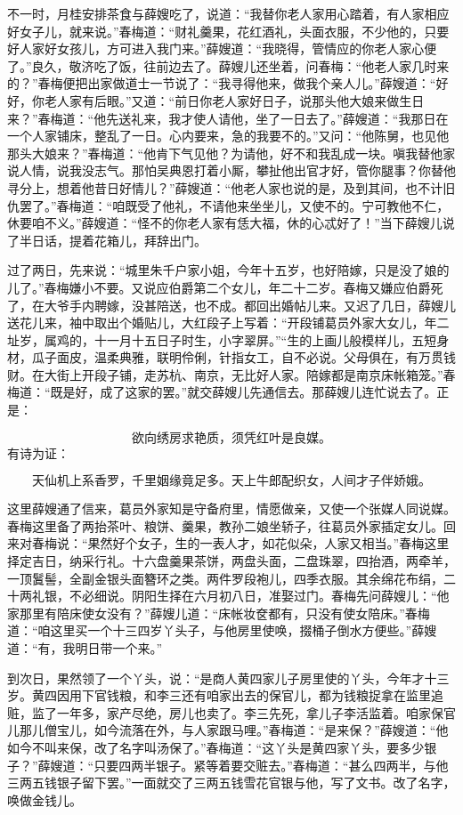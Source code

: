 不一时，月桂安排茶食与薛嫂吃了，说道：“我替你老人家用心踏着，有人家相应好女子儿，就来说。”春梅道：“财礼羹果，花红酒礼，头面衣服，不少他的，只要好人家好女孩儿，方可进入我门来。”薛嫂道：“我晓得，管情应的你老人家心便了。”良久，敬济吃了饭，往前边去了。薛嫂儿还坐着，问春梅：“他老人家几时来的？”春梅便把出家做道士一节说了：“我寻得他来，做我个亲人儿。”薛嫂道：“好好，你老人家有后眼。”又道：“前日你老人家好日子，说那头他大娘来做生日来？”春梅道：“他先送礼来，我才使人请他，坐了一日去了。”薛嫂道：“我那日在一个人家铺床，整乱了一日。心内要来，急的我要不的。”又问：“他陈舅，也见他那头大娘来？”春梅道：“他肯下气见他？为请他，好不和我乱成一块。嗔我替他家说人情，说我没志气。那怕吴典恩打着小厮，攀扯他出官才好，管你腿事？你替他寻分上，想着他昔日好情儿？”薛嫂道：“他老人家也说的是，及到其间，也不计旧仇罢了。”春梅道：“咱既受了他礼，不请他来坐坐儿，又使不的。宁可教他不仁，休要咱不义。”薛嫂道：“怪不的你老人家有恁大福，休的心忒好了！”当下薛嫂儿说了半日话，提着花箱儿，拜辞出门。

过了两日，先来说：“城里朱千户家小姐，今年十五岁，也好陪嫁，只是没了娘的儿了。”春梅嫌小不要。又说应伯爵第二个女儿，年二十二岁。春梅又嫌应伯爵死了，在大爷手内聘嫁，没甚陪送，也不成。都回出婚帖儿来。又迟了几日，薛嫂儿送花儿来，袖中取出个婚贴儿，大红段子上写着：“开段铺葛员外家大女儿，年二址岁，属鸡的，十一月十五日子时生，小字翠屏。”“生的上画儿般模样儿，五短身材，瓜子面皮，温柔典雅，联明伶俐，针指女工，自不必说。父母俱在，有万贯钱财。在大街上开段子铺，走苏杭、南京，无比好人家。陪嫁都是南京床帐箱笼。”春梅道：“既是好，成了这家的罢。”就交薛嫂儿先通信去。那薛嫂儿连忙说去了。正是：

\[
欲向绣房求艳质，须凭红叶是良媒。
\]
有诗为证：

\[
天仙机上系香罗，千里姻缘竟足多。
天上牛郎配织女，人间才子伴娇娥。
\]

这里薛嫂通了信来，葛员外家知是守备府里，情愿做亲，又使一个张媒人同说媒。春梅这里备了两抬茶叶、粮饼、羹果，教孙二娘坐轿子，往葛员外家插定女儿。回来对春梅说：“果然好个女子，生的一表人才，如花似朵，人家又相当。”春梅这里择定吉日，纳采行礼。十六盘羹果茶饼，两盘头面，二盘珠翠，四抬酒，两牵羊，一顶鬒髻，全副金银头面簪环之类。两件罗段袍儿，四季衣服。其余绵花布绢，二十两礼银，不必细说。阴阳生择在六月初八日，准娶过门。春梅先问薛嫂儿：“他家那里有陪床使女没有？”薛嫂儿道：“床帐妆奁都有，只没有使女陪床。”春梅道：“咱这里买一个十三四岁丫头子，与他房里使唤，掇桶子倒水方便些。”薛嫂道：“有，我明日带一个来。”

到次日，果然领了一个丫头，说：“是商人黄四家儿子房里使的丫头，今年才十三岁。黄四因用下官钱粮，和李三还有咱家出去的保官儿，都为钱粮捉拿在监里追赃，监了一年多，家产尽绝，房儿也卖了。李三先死，拿儿子李活监着。咱家保官儿那儿僧宝儿，如今流落在外，与人家跟马哩。”春梅道：“是来保？”薛嫂道：“他如今不叫来保，改了名字叫汤保了。”春梅道：“这丫头是黄四家丫头，要多少银子？”薛嫂道：“只要四两半银子。紧等着要交赃去。”春梅道：“甚么四两半，与他三两五钱银子留下罢。”一面就交了三两五钱雪花官银与他，写了文书。改了名字，唤做金钱儿。

